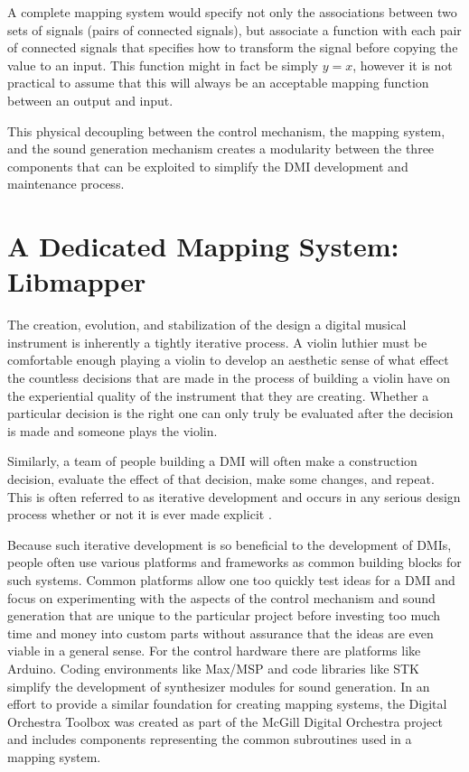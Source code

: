 A complete mapping system would specify not only the associations between two sets of signals (pairs of connected signals), but associate a function with each pair of connected signals that specifies how to transform the signal before copying the value to an input. This function might in fact be simply \begin{math}y = x\end{math}, however it is not practical to assume that this will always be an acceptable mapping function between an output and input.

This physical decoupling between the control mechanism, the mapping system, and the sound generation mechanism creates a modularity between the three components that can be exploited to simplify the DMI development and maintenance process.

\section{A Dedicated Mapping System: Libmapper}

The creation, evolution, and stabilization of the design a digital musical instrument is inherently a tightly iterative process. A violin luthier must be comfortable enough playing a violin to develop an aesthetic sense of what effect the countless decisions that are made in the process of building a violin have on the experiential quality of the instrument that they are creating. Whether a particular decision is the right one can only truly be evaluated after the decision is made and someone plays the violin. 

Similarly, a team of people building a DMI will often make a construction decision, evaluate the effect of that decision, make some changes, and repeat. This is often referred to as iterative development and occurs in any serious design process whether or not it is ever made explicit \cite{iterative2003}. 

Because such iterative development is so beneficial to the development of DMIs, people often use various platforms and frameworks as common building blocks for such systems. Common platforms allow one too quickly test ideas for a DMI and focus on experimenting with the aspects of the control mechanism and sound generation that are unique to the particular project before investing too much time and money into custom parts without assurance that the ideas are even viable in a general sense. For the control hardware there are platforms like Arduino. Coding environments like Max/MSP and code libraries like STK simplify the development of synthesizer modules for sound generation. In an effort to provide a similar foundation for creating mapping systems, the Digital Orchestra Toolbox was created as part of the McGill Digital Orchestra project and includes components representing the common subroutines used in a mapping system. 

